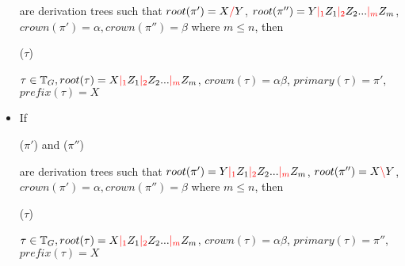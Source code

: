 \documentclass[main.tex]{subfiles}
\begin{document}
\begin{defn}
\begin{itemize}
            are derivation trees such that $ root(\pi') = X \textcolor{red}{/} Y $,
            $ root(\pi'') = Y \textcolor{red}{|_{1}} Z_1 \textcolor{red}{|_{2}} Z_2 ... \textcolor{red}{|_{m}} Z_m $,
            $ crown(\pi') = \alpha, crown(\pi'') = \beta $
            where $m \leq n$, then
            \begin{center}
                 ($\tau$)
            \end{center}
            $ \tau \in \mathbb{T}_{ G }, root(\tau) = X \textcolor{red}{|_{1}} Z_1 \textcolor{red}{|_{2}} Z_2 ... \textcolor{red}{|_{m}} Z_m $,
            $ crown(\tau) = \alpha \beta $, $primary(\tau) = \pi'$, $prefix(\tau) = X$
        \item If
            \begin{center}
                 ($\pi'$)
                \quad and \quad
                 ($\pi''$)
            \end{center}
            are derivation trees such that
            $ root(\pi') = Y \textcolor{red}{|_{1}} Z_1 \textcolor{red}{|_{2}} Z_2 ... \textcolor{red}{|_{m}} Z_m $,
            $ root(\pi'') = X \textcolor{red}{\backslash} Y $,
            $ crown(\pi') = \alpha, crown(\pi'') = \beta $
            where $m \leq n$, then
            \begin{center}
                 ($\tau$)
            \end{center}
            $ \tau \in \mathbb{T}_{ G }, root(\tau) = X \textcolor{red}{|_{1}} Z_1 \textcolor{red}{|_{2}} Z_2 ... \textcolor{red}{|_{m}} Z_m $,
            $ crown(\tau) = \alpha \beta $, $primary(\tau) = \pi''$, $prefix(\tau) = X$
    \end{itemize}
\end{defn}
\end{document}
